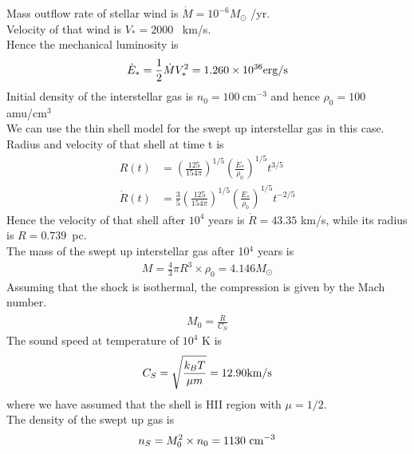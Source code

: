 \documentclass{jhwhw}
\begin{document}
\solution
Mass outflow rate of stellar wind is $\dot{M} = 10^{-6} M_{\odot}$ /yr.\\
Velocity of that wind is $V_* = 2000$ ~km/s.\\
Hence the mechanical luminosity is 
\begin{align}
\dot{E}_* = \frac{1}{2} \dot{M} V_*^{2} = 1.260 \times 10^{36} \rm{erg/s}
\end{align} 
Initial density of the interstellar gas is $n_0 = 100 ~$cm$^{-3}$ and hence  $\rho_0 = 100 ~$amu/cm$^{3}$\\
We can use the thin shell model for the swept up interstellar gas in this case.\\
Radius and velocity of that shell at time t is
\begin{align}
R(t) &= \left( \frac{125}{154 \pi} \right) ^{1/5}  \left( \frac{\dot{E}_*}{\rho_0} \right)^{1/5}  t^{3/5}\\
\dot{R}(t) &= \frac{3}{5} \left( \frac{125}{154 \pi} \right) ^{1/5}  \left( \frac{\dot{E}_*}{\rho_0} \right)^{1/5}  t^{-2/5}
\end{align}
Hence the velocity of that shell after $10^4$ years is $\dot{R} = 43.35$ km/s, while its radius is $R=0.739$~pc.\\
The mass of the swept up interstellar gas after 10$^4$ years is
\begin{align}
M = \frac{4}{3} \pi R^3 \times \rho_0 = 4.146 M_{\odot}
\end{align}
%
Assuming that the shock is isothermal, the compression is given by the Mach number.
\begin{align}
M_0 = \frac{\dot{R}}{C_{S}}
\end{align}
The sound speed at temperature of $10^4$ K is 
\begin{align}
C_S = \sqrt{\frac{k_B T}{\mu m}} = 12.90 \rm{km/s}
\end{align}
where we have assumed that the shell is HII region with $\mu = 1/2$.\\
The density of the swept up gas is
\begin{align}
n_S = M_0^2 \times n_0 = 1130 ~\rm{cm^{-3}}
\end{align}
















\end{document}
